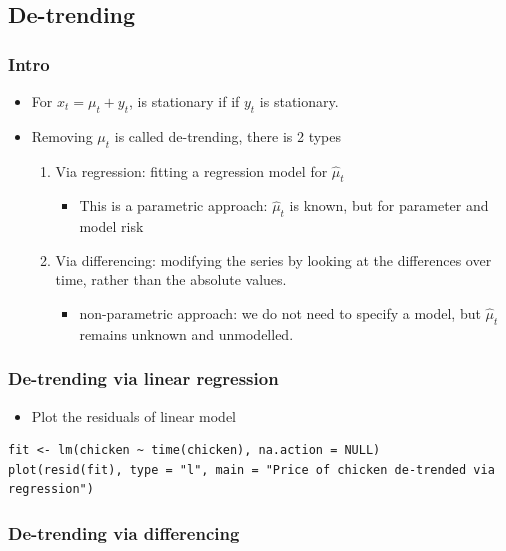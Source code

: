 \documentclass{article}
\begin{document}
\subsection{De-trending}

\subsubsection{Intro}
\begin{itemize}
    \item For $x_t = \mu_t + y_t$, is stationary if if $y_t$ is stationary.
    \item Removing $\mu_t$ is called de-trending, there is 2 types
    \begin{enumerate}
        \item Via regression: fitting a regression model for $\hat{\mu}_t$
        \begin{itemize}
            \item This is a parametric approach: $\hat{\mu}_t$ is known, but for parameter and model risk
        \end{itemize}
        \item Via differencing: modifying the series by looking at the differences over time, rather than the absolute values.
        \begin{itemize}
            \item non-parametric approach: we do not need to specify a model, but $\hat{\mu}_t$ remains unknown and unmodelled.
        \end{itemize}
    \end{enumerate}
\end{itemize}

\subsubsection{De-trending via linear regression}

\begin{itemize}
    \item Plot the residuals of linear model
\end{itemize}

\begin{lstlisting}
fit <- lm(chicken ~ time(chicken), na.action = NULL)
plot(resid(fit), type = "l", main = "Price of chicken de-trended via regression")
\end{lstlisting}

\subsubsection{De-trending via differencing}
\end{document}
